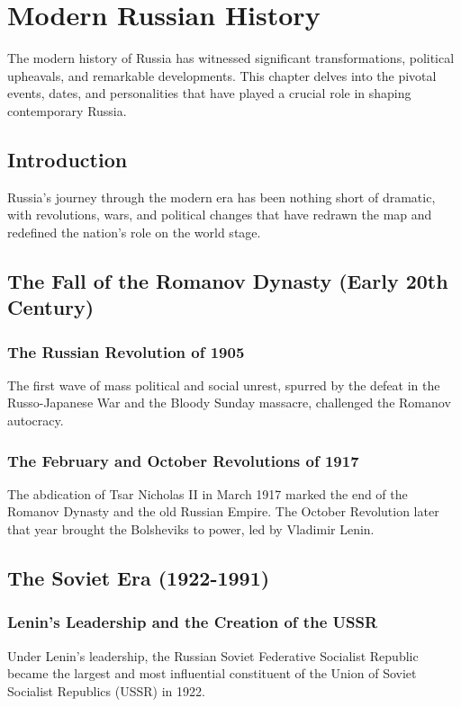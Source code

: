 \documentclass[a4paper,12pt]{book}
\begin{document}
\chapter{Modern Russian History}
\label{ch:modern-russian-history}

The modern history of Russia has witnessed significant transformations, political upheavals, and remarkable developments. This chapter delves into the pivotal events, dates, and personalities that have played a crucial role in shaping contemporary Russia.

\section{Introduction}
\label{sec:introduction-modern-russia}
Russia’s journey through the modern era has been nothing short of dramatic, with revolutions, wars, and political changes that have redrawn the map and redefined the nation’s role on the world stage.

\section{The Fall of the Romanov Dynasty (Early 20th Century)}
\label{sec:fall-romanov-dynasty}
\subsection{The Russian Revolution of 1905}
The first wave of mass political and social unrest, spurred by the defeat in the Russo-Japanese War and the Bloody Sunday massacre, challenged the Romanov autocracy.

\subsection{The February and October Revolutions of 1917}
The abdication of Tsar Nicholas II in March 1917 marked the end of the Romanov Dynasty and the old Russian Empire. The October Revolution later that year brought the Bolsheviks to power, led by Vladimir Lenin.

\section{The Soviet Era (1922-1991)}
\label{sec:soviet-era}
\subsection{Lenin’s Leadership and the Creation of the USSR}
Under Lenin’s leadership, the Russian Soviet Federative Socialist Republic became the largest and most influential constituent of the Union of Soviet Socialist Republics (USSR) in 1922.
\end{document}
